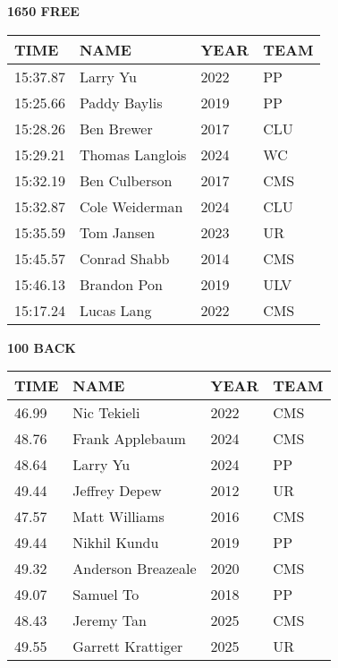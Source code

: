 \begin{table}[H]
\centering
\begin{minipage}[t]{0.48\textwidth}
\centering
\textbf{1650 FREE}\\[0.1cm]
\begin{tabular}{@{}p{1.8cm}p{2.8cm}p{1.2cm}p{1.4cm}@{}}
\hline
    \textbf{TIME} & \textbf{NAME} & \textbf{YEAR} & \textbf{TEAM} \\
\hline
    15:37.87 & Larry Yu & 2022 & PP \\
    15:25.66 & Paddy Baylis & 2019 & PP \\
    15:28.26 & Ben Brewer & 2017 & CLU \\
    15:29.21 & Thomas Langlois & 2024 & WC \\
    15:32.19 & Ben Culberson & 2017 & CMS \\
    15:32.87 & Cole Weiderman & 2024 & CLU \\
    15:35.59 & Tom Jansen & 2023 & UR \\
    15:45.57 & Conrad Shabb & 2014 & CMS \\
    15:46.13 & Brandon Pon & 2019 & ULV \\
    15:17.24 & Lucas Lang & 2022 & CMS \\
\hline
\end{tabular}
\end{minipage}\hfill
\begin{minipage}[t]{0.48\textwidth}
\centering
\textbf{100 BACK}\\[0.1cm]
\begin{tabular}{@{}p{1.8cm}p{2.8cm}p{1.2cm}p{1.4cm}@{}}
\hline
    \textbf{TIME} & \textbf{NAME} & \textbf{YEAR} & \textbf{TEAM} \\
\hline
    46.99 & Nic Tekieli & 2022 & CMS \\
    48.76 & Frank Applebaum & 2024 & CMS \\
    48.64 & Larry Yu & 2024 & PP \\
    49.44 & Jeffrey Depew & 2012 & UR \\
    47.57 & Matt Williams & 2016 & CMS \\
    49.44 & Nikhil Kundu & 2019 & PP \\
    49.32 & Anderson Breazeale & 2020 & CMS \\
    49.07 & Samuel To & 2018 & PP \\
    48.43 & Jeremy Tan & 2025 & CMS \\
    49.55 & Garrett Krattiger & 2025 & UR \\
\hline
\end{tabular}
\end{minipage}
\end{table}


